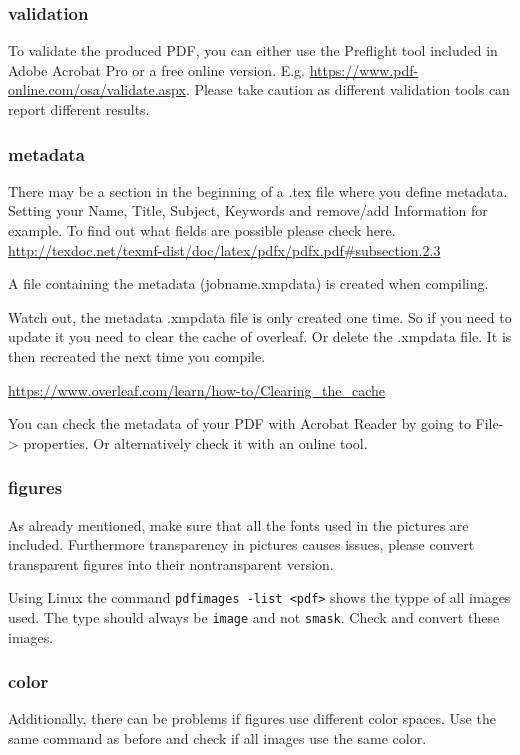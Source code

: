 	
	\subsubsection{validation}
	To validate the produced PDF, you can either use the Preflight tool included in Adobe Acrobat Pro or a free online version. E.g. \url{https://www.pdf-online.com/osa/validate.aspx}.
	Please take caution as different validation tools can report different results.
	
	\subsubsection{metadata}
	There may be a section in the beginning of a .tex file where you define metadata.
	Setting your Name, Title, Subject, Keywords and remove/add Information for example. To find out what fields are possible please check here. \url{http://texdoc.net/texmf-dist/doc/latex/pdfx/pdfx.pdf#subsection.2.3}
	
	A file containing the metadata (jobname.xmpdata) is created when compiling. 
	
	Watch out, the metadata .xmpdata file is only created one time. So if you need to update it you need to clear the cache of overleaf. Or delete the .xmpdata file. It is then recreated the next time you compile. 
	
	\url{https://www.overleaf.com/learn/how-to/Clearing_the_cache}
	
	You can check the metadata of your PDF with Acrobat Reader by going to File-> properties. Or alternatively check it with an online tool.
	
	\subsubsection{figures}
	As already mentioned, make sure that all the fonts used in the pictures are included. Furthermore transparency in pictures causes issues, please convert transparent figures into their nontransparent version. 
	
	Using Linux the command \verb|pdfimages -list <pdf>| shows the typpe of all images used. The type should always be \verb|image| and not \verb|smask|. Check and convert these images.
	
	\subsubsection{color}
	Additionally, there can be problems if figures use different color spaces. Use the same command as before and check if all images use the same color. 
	
